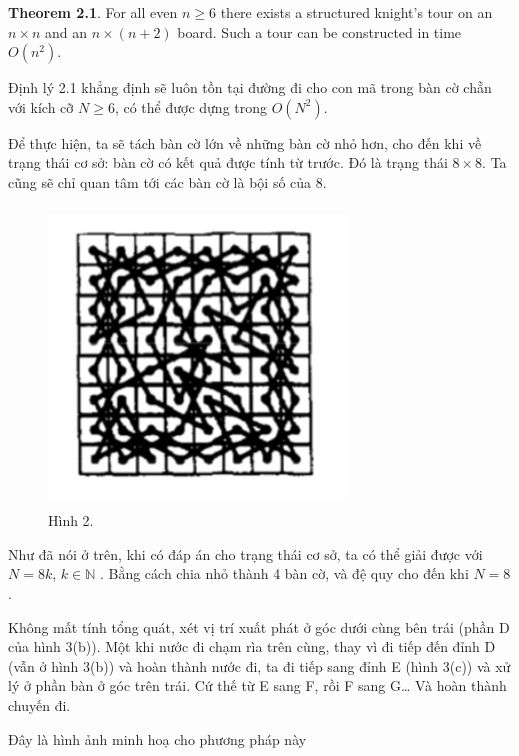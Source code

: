 \documentclass[
]{article}
\begin{document}
\textbf{Theorem 2.1}. For all even \(n \ge 6\) there exists a structured
knight's tour on an \(n \times n\) and an \(n \times (n + 2)\) board.
Such a tour can be constructed in time \(O(n^2)\).

Định lý 2.1 khẳng định sẽ luôn tồn tại đường đi cho con mã trong bàn cờ
chẵn với kích cỡ \(N\ge 6\), có thể được dựng trong \(O(N^2)\).

Để thực hiện, ta sẽ tách bàn cờ lớn về những bàn cờ nhỏ hơn, cho đến khi
về trạng thái cơ sở: bàn cờ có kết quả được tính từ trước. Đó là trạng
thái \(8\times 8\). Ta cũng sẽ chỉ quan tâm tới các bàn cờ là bội số của
8.

\begin{figure}
\centering
\includegraphics[width=3.125in,height=3.125in]{Homework 5 Trial and Error 3b646dc8160042df9d000a4baa7eeb4e/Untitled 3.png}
\caption{Hình 2.}
\end{figure}

Như đã nói ở trên, khi có đáp án cho trạng thái cơ sở, ta có thể giải
được với \(N = 8k\), \(k\in \mathbb{N}\) . Bằng cách chia nhỏ thành 4
bàn cờ, và đệ quy cho đến khi \(N=8\).

Không mất tính tổng quát, xét vị trí xuất phát ở góc dưới cùng bên trái
(phần D của hình 3(b)). Một khi nước đi chạm rìa trên cùng, thay vì đi
tiếp đến đỉnh D (vẫn ở hình 3(b)) và hoàn thành nước đi, ta đi tiếp sang
đỉnh E (hình 3(c)) và xử lý ở phần bàn ở góc trên trái. Cứ thế từ E sang
F, rồi F sang G\ldots{} Và hoàn thành chuyến đi.

Đây là hình ảnh minh hoạ cho phương pháp này
\end{document}
